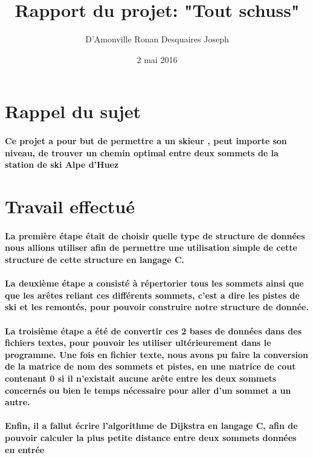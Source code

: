 \documentclass[a4paper,11pt,fleqn]{article}
\author {D'Amonville Ronan Desquaires Joseph}
\title {Rapport du projet: "Tout schuss"}
\date{2 mai 2016}
\begin{document}
\maketitle

\hspace{5cm}
\section{Rappel du sujet}

\paragraph{Ce projet a pour but de permettre a un skieur , peut importe son niveau, de trouver un chemin optimal entre deux sommets de la station de ski Alpe d'Huez}

\section{Travail effectué}

\paragraph{La première étape était de choisir quelle type de structure de données nous allions utiliser afin de permettre une utilisation simple de cette structure de cette structure en langage C.}

\paragraph{La deuxième étape a consisté à répertorier tous les sommets ainsi que que les arêtes reliant ces différents sommets, c'est a dire les pistes de ski et les remontés, pour pouvoir construire notre structure de donnée.}

\paragraph{La troisième étape a été de convertir ces 2 bases de données dans des fichiers textes, pour pouvoir les utiliser ultérieurement dans le programme. Une fois en fichier texte, nous avons pu faire la conversion de la matrice de nom des sommets et pistes, en une matrice de cout contenant 0 si il n'existait aucune arête entre les deux sommets concernés ou bien le temps nécessaire pour aller d'un sommet a un autre.}

\paragraph{Enfin, il a fallut écrire l'algorithme de Dijkstra en langage C, afin de pouvoir calculer la plus petite distance entre deux sommets données en entrée}                                                                                                                                                                                                                                                                                                                                                                                                                                              
\end{document}
